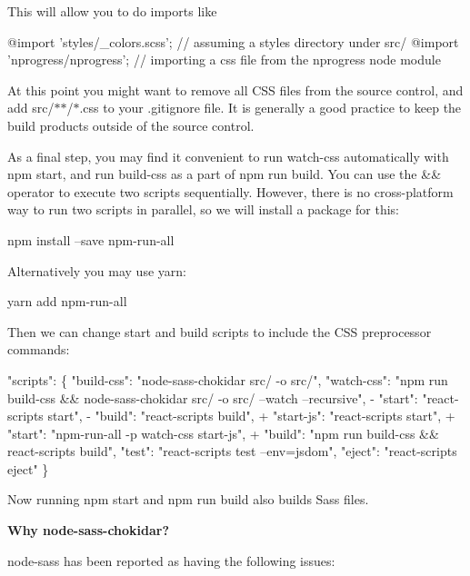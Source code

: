 This will allow you to do imports like


\begin{DoxyCode}
@import 'styles/\_colors.scss'; // assuming a styles directory under src/
@import 'nprogress/nprogress'; // importing a css file from the nprogress node module
\end{DoxyCode}


At this point you might want to remove all C\+SS files from the source control, and add {\ttfamily src/$\ast$$\ast$/$\ast$.css} to your {\ttfamily .gitignore} file. It is generally a good practice to keep the build products outside of the source control.

As a final step, you may find it convenient to run {\ttfamily watch-\/css} automatically with {\ttfamily npm start}, and run {\ttfamily build-\/css} as a part of {\ttfamily npm run build}. You can use the {\ttfamily \&\&} operator to execute two scripts sequentially. However, there is no cross-\/platform way to run two scripts in parallel, so we will install a package for this\+:


\begin{DoxyCode}
npm install --save npm-run-all
\end{DoxyCode}


Alternatively you may use {\ttfamily yarn}\+:


\begin{DoxyCode}
yarn add npm-run-all
\end{DoxyCode}


Then we can change {\ttfamily start} and {\ttfamily build} scripts to include the C\+SS preprocessor commands\+:


\begin{DoxyCode}
   "scripts": \{
     "build-css": "node-sass-chokidar src/ -o src/",
     "watch-css": "npm run build-css && node-sass-chokidar src/ -o src/ --watch --recursive",
-    "start": "react-scripts start",
-    "build": "react-scripts build",
+    "start-js": "react-scripts start",
+    "start": "npm-run-all -p watch-css start-js",
+    "build": "npm run build-css && react-scripts build",
     "test": "react-scripts test --env=jsdom",
     "eject": "react-scripts eject"
   \}
\end{DoxyCode}


Now running {\ttfamily npm start} and {\ttfamily npm run build} also builds Sass files.

{\bfseries Why {\ttfamily node-\/sass-\/chokidar}?}

{\ttfamily node-\/sass} has been reported as having the following issues\+:


